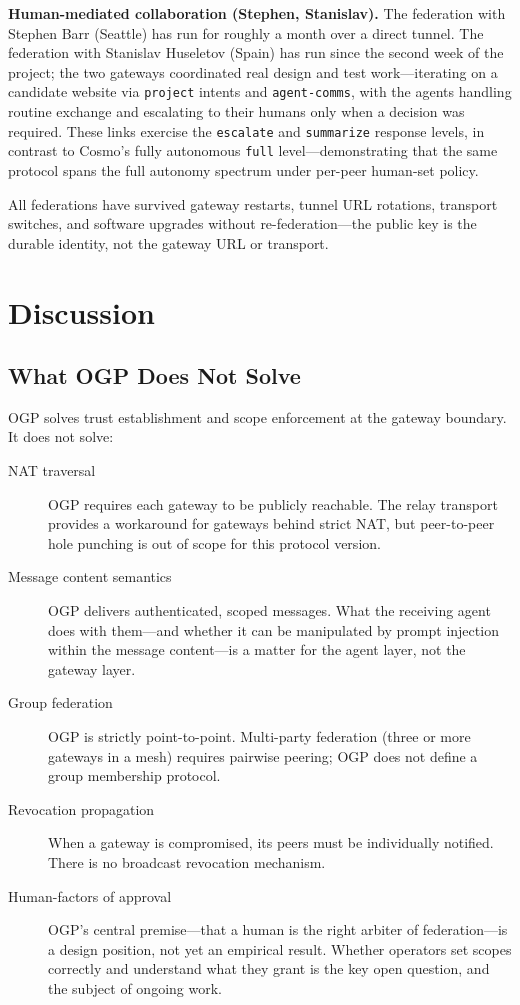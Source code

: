 \documentclass[sigconf,nonacm]{acmart}
\begin{document}
\vspace{0.3em}
\noindent\textbf{Human-mediated collaboration (Stephen, Stanislav).}
The federation with Stephen Barr (Seattle) has run for roughly a month
over a direct tunnel. The federation with Stanislav Huseletov (Spain) has
run since the second week of the project; the two gateways coordinated
real design and test work---iterating on a candidate website via
\texttt{project} intents and \texttt{agent-comms}, with the agents
handling routine exchange and escalating to their humans only when a
decision was required. These links exercise the \texttt{escalate} and
\texttt{summarize} response levels, in contrast to Cosmo's fully
autonomous \texttt{full} level---demonstrating that the same protocol
spans the full autonomy spectrum under per-peer human-set policy.

\vspace{0.3em}
All federations have survived gateway restarts, tunnel URL rotations,
transport switches, and software upgrades without re-federation---the
public key is the durable identity, not the gateway URL or transport.

\section{Discussion}

\subsection{What OGP Does Not Solve}

OGP solves trust establishment and scope enforcement at the gateway
boundary. It does not solve:

\begin{description}
\item[NAT traversal] OGP requires each gateway to be publicly reachable.
  The relay transport provides a workaround for gateways behind strict NAT,
  but peer-to-peer hole punching is out of scope for this protocol version.
\item[Message content semantics] OGP delivers authenticated, scoped messages.
  What the receiving agent does with them---and whether it can be
  manipulated by prompt injection within the message content---is a
  matter for the agent layer, not the gateway layer.
\item[Group federation] OGP is strictly point-to-point.
  Multi-party federation (three or more gateways in a mesh) requires
  pairwise peering; OGP does not define a group membership protocol.
\item[Revocation propagation] When a gateway is compromised,
  its peers must be individually notified. There is no broadcast
  revocation mechanism.
\item[Human-factors of approval] OGP's central premise---that a human is
  the right arbiter of federation---is a design position, not yet an
  empirical result. Whether operators set scopes correctly and understand
  what they grant is the key open question, and the subject of ongoing work.
\end{description}
\end{document}
